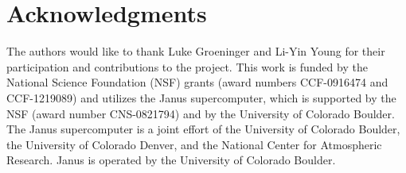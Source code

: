 \documentclass{sig-alternate}
\begin{document}
\section*{Acknowledgments}


The authors would like to thank Luke Groeninger and Li-Yin Young for their participation and contributions to the project.
This work is funded by the National Science Foundation (NSF) grants (award numbers CCF-0916474 and CCF-1219089) and
utilizes the Janus supercomputer, which is supported by the NSF (award number CNS-0821794) and by the University of Colorado Boulder.
The Janus supercomputer is a joint effort of the University of Colorado Boulder, the University of Colorado Denver, and the National Center
for Atmospheric Research. Janus is operated by the University of Colorado Boulder.

\clearpage

  
\end{document}
